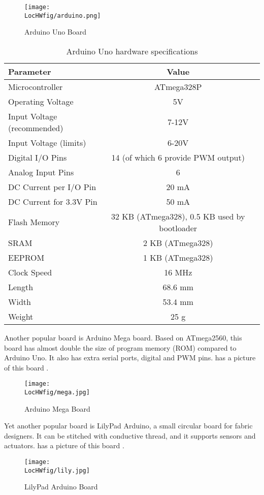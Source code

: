 \begin{figure}
  \centering
  \texttt{[image: \\LocHWfig/arduino.png]}
  \caption{Arduino Uno Board}
  \label{arduino}
\end{figure}

\begin{table}
\begin{center}
\begin{tabular}{ || l | c || r }
 \hline		
{\bf Parameter} & {\bf Value} \\ \hline	
 Microcontroller & ATmega328P\\
Operating Voltage & 5V\\
Input Voltage (recommended) & 7-12V\\
Input Voltage (limits) & 6-20V\\
Digital I/O Pins & 14 (of which 6 provide PWM output)\\
Analog Input Pins & 6\\
DC Current per I/O Pin & 20 mA\\
DC Current for 3.3V Pin & 50 mA\\
Flash Memory & 32 KB (ATmega328), 0.5 KB used by bootloader\\
SRAM & 2 KB (ATmega328)\\
EEPROM & 1 KB (ATmega328)\\
Clock Speed & 16 MHz\\
Length & 68.6 mm\\
Width & 53.4 mm\\
Weight & 25 g\\
 \hline 
\end{tabular}
\caption{Arduino Uno hardware specifications}
\label{micro-table}
\end{center}
\end{table}

Another popular board is Arduino Mega board.  Based on
ATmega2560, this board has almost double the size of program
memory (ROM) compared to Arduino Uno.  It also has extra serial ports,
digital and PWM pins.   has a picture of this board
\cite{mega-ref}. 
\begin{figure}
  \centering
  \texttt{[image: \\LocHWfig/mega.jpg]}
  \caption{Arduino Mega Board}
  \label{mega}
\end{figure}

Yet another popular board is LilyPad Arduino, a small circular
board for fabric designers. It can be stitched with conductive thread,
and it supports sensors and actuators.   has a picture of
this board \cite{lily-ref}.
\begin{figure}
  \centering
  \texttt{[image: \\LocHWfig/lily.jpg]}
  \caption{LilyPad Arduino Board}
  \label{lily}
\end{figure}

